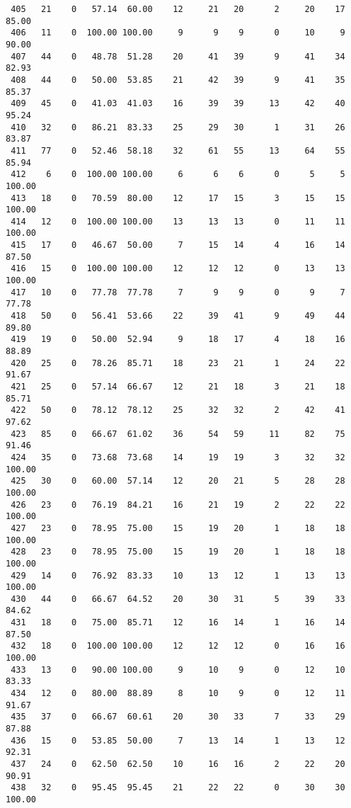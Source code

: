 \begin{verbatim}
 405   21    0   57.14  60.00    12     21   20      2     20    17    85.00
 406   11    0  100.00 100.00     9      9    9      0     10     9    90.00
 407   44    0   48.78  51.28    20     41   39      9     41    34    82.93
 408   44    0   50.00  53.85    21     42   39      9     41    35    85.37
 409   45    0   41.03  41.03    16     39   39     13     42    40    95.24
 410   32    0   86.21  83.33    25     29   30      1     31    26    83.87
 411   77    0   52.46  58.18    32     61   55     13     64    55    85.94
 412    6    0  100.00 100.00     6      6    6      0      5     5   100.00
 413   18    0   70.59  80.00    12     17   15      3     15    15   100.00
 414   12    0  100.00 100.00    13     13   13      0     11    11   100.00
 415   17    0   46.67  50.00     7     15   14      4     16    14    87.50
 416   15    0  100.00 100.00    12     12   12      0     13    13   100.00
 417   10    0   77.78  77.78     7      9    9      0      9     7    77.78
 418   50    0   56.41  53.66    22     39   41      9     49    44    89.80
 419   19    0   50.00  52.94     9     18   17      4     18    16    88.89
 420   25    0   78.26  85.71    18     23   21      1     24    22    91.67
 421   25    0   57.14  66.67    12     21   18      3     21    18    85.71
 422   50    0   78.12  78.12    25     32   32      2     42    41    97.62
 423   85    0   66.67  61.02    36     54   59     11     82    75    91.46
 424   35    0   73.68  73.68    14     19   19      3     32    32   100.00
 425   30    0   60.00  57.14    12     20   21      5     28    28   100.00
 426   23    0   76.19  84.21    16     21   19      2     22    22   100.00
 427   23    0   78.95  75.00    15     19   20      1     18    18   100.00
 428   23    0   78.95  75.00    15     19   20      1     18    18   100.00
 429   14    0   76.92  83.33    10     13   12      1     13    13   100.00
 430   44    0   66.67  64.52    20     30   31      5     39    33    84.62
 431   18    0   75.00  85.71    12     16   14      1     16    14    87.50
 432   18    0  100.00 100.00    12     12   12      0     16    16   100.00
 433   13    0   90.00 100.00     9     10    9      0     12    10    83.33
 434   12    0   80.00  88.89     8     10    9      0     12    11    91.67
 435   37    0   66.67  60.61    20     30   33      7     33    29    87.88
 436   15    0   53.85  50.00     7     13   14      1     13    12    92.31
 437   24    0   62.50  62.50    10     16   16      2     22    20    90.91
 438   32    0   95.45  95.45    21     22   22      0     30    30   100.00

\end{verbatim}
